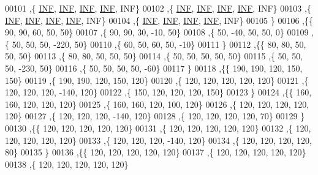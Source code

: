 \begin{DoxyCode}
00101   ,\{   \hyperlink{energy__const_8h_a12c2040f25d8e3a7b9e1c2024c618cb6}{INF},   \hyperlink{energy__const_8h_a12c2040f25d8e3a7b9e1c2024c618cb6}{INF},   \hyperlink{energy__const_8h_a12c2040f25d8e3a7b9e1c2024c618cb6}{INF},   \hyperlink{energy__const_8h_a12c2040f25d8e3a7b9e1c2024c618cb6}{INF},   INF\}
00102   ,\{   \hyperlink{energy__const_8h_a12c2040f25d8e3a7b9e1c2024c618cb6}{INF},   \hyperlink{energy__const_8h_a12c2040f25d8e3a7b9e1c2024c618cb6}{INF},   \hyperlink{energy__const_8h_a12c2040f25d8e3a7b9e1c2024c618cb6}{INF},   \hyperlink{energy__const_8h_a12c2040f25d8e3a7b9e1c2024c618cb6}{INF},   INF\}
00103   ,\{   \hyperlink{energy__const_8h_a12c2040f25d8e3a7b9e1c2024c618cb6}{INF},   \hyperlink{energy__const_8h_a12c2040f25d8e3a7b9e1c2024c618cb6}{INF},   \hyperlink{energy__const_8h_a12c2040f25d8e3a7b9e1c2024c618cb6}{INF},   \hyperlink{energy__const_8h_a12c2040f25d8e3a7b9e1c2024c618cb6}{INF},   INF\}
00104   ,\{   \hyperlink{energy__const_8h_a12c2040f25d8e3a7b9e1c2024c618cb6}{INF},   \hyperlink{energy__const_8h_a12c2040f25d8e3a7b9e1c2024c618cb6}{INF},   \hyperlink{energy__const_8h_a12c2040f25d8e3a7b9e1c2024c618cb6}{INF},   \hyperlink{energy__const_8h_a12c2040f25d8e3a7b9e1c2024c618cb6}{INF},   INF\}
00105   \}
00106  ,\{\{    90,    90,    60,    50,    50\}
00107   ,\{    90,    90,    30,   -10,    50\}
00108   ,\{    50,   -40,    50,    50,     0\}
00109   ,\{    50,    50,    50,  -220,    50\}
00110   ,\{    60,    50,    60,    50,   -10\}
00111   \}
00112  ,\{\{    80,    80,    50,    50,    50\}
00113   ,\{    80,    80,    50,    50,    50\}
00114   ,\{    50,    50,    50,    50,    50\}
00115   ,\{    50,    50,    50,  -230,    50\}
00116   ,\{    50,    50,    50,    50,   -60\}
00117   \}
00118  ,\{\{   190,   190,   120,   150,   150\}
00119   ,\{   190,   190,   120,   150,   120\}
00120   ,\{   120,   120,   120,   120,   120\}
00121   ,\{   120,   120,   120,  -140,   120\}
00122   ,\{   150,   120,   120,   120,   150\}
00123   \}
00124  ,\{\{   160,   160,   120,   120,   120\}
00125   ,\{   160,   160,   120,   100,   120\}
00126   ,\{   120,   120,   120,   120,   120\}
00127   ,\{   120,   120,   120,  -140,   120\}
00128   ,\{   120,   120,   120,   120,    70\}
00129   \}
00130  ,\{\{   120,   120,   120,   120,   120\}
00131   ,\{   120,   120,   120,   120,   120\}
00132   ,\{   120,   120,   120,   120,   120\}
00133   ,\{   120,   120,   120,  -140,   120\}
00134   ,\{   120,   120,   120,   120,    80\}
00135   \}
00136  ,\{\{   120,   120,   120,   120,   120\}
00137   ,\{   120,   120,   120,   120,   120\}
00138   ,\{   120,   120,   120,   120,   120\}

\end{DoxyCode}
